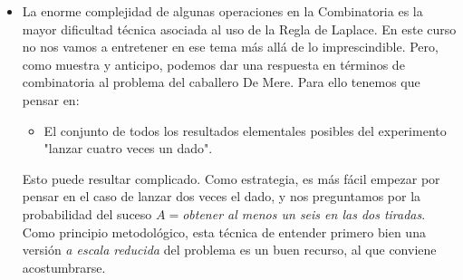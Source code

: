 \begin{itemize}
    \item La enorme complejidad de algunas operaciones en la Combinatoria es la mayor dificultad técnica asociada al uso de la Regla de Laplace. En este curso no nos vamos a entretener en ese tema más allá de lo imprescindible. Pero, como muestra y anticipo, podemos dar una respuesta en términos de combinatoria al problema del caballero De Mere.  Para ello tenemos que pensar en:
        \begin{itemize}
            \item[] {\sf El conjunto de todos los resultados elementales posibles del experimento "lanzar cuatro veces un dado".}
        \end{itemize}
        Esto puede resultar complicado. Como estrategia, es más fácil empezar por pensar en el caso de lanzar dos veces el dado, y nos preguntamos por la probabilidad del suceso $A=${\em obtener al menos un seis en las dos tiradas}. Como principio metodológico, esta técnica de entender primero bien una versión {\em a escala reducida} del problema es un buen recurso, al que conviene acostumbrarse.


\end{itemize}
